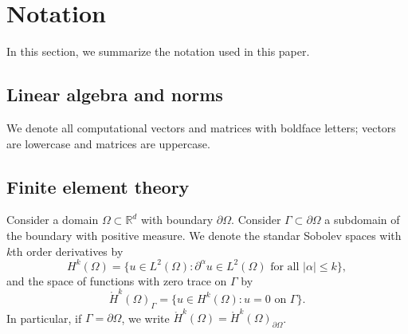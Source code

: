 
\appendix
\section{Notation}

In this section, we summarize the notation used in this paper.

\subsection{Linear algebra and norms}

We denote all computational vectors and matrices with boldface letters; vectors are lowercase and matrices are uppercase.


\subsection{Finite element theory}

Consider a domain \(\Omega \subset \mathbb{R}^d\) with boundary \(\partial \Omega\).
Consider \(\Gamma \subset \partial \Omega\) a subdomain of the boundary with positive measure.
We denote the standar Sobolev spaces with \(k\)th order derivatives by
\[
    H^k(\Omega) = \{ u \in L^2(\Omega) : \partial^\alpha u \in L^2(\Omega) \text{ for all } |\alpha| \leq k \},
\]
and the space of functions with zero trace on \(\Gamma\) by
\[
    \mathring{H}^k(\Omega)_\Gamma = \{ u \in H^k(\Omega) : u = 0 \text{ on } \Gamma \}.
\]
In particular, if \(\Gamma = \partial \Omega\), we write \(\mathring{H}^k(\Omega) = \mathring{H}^k(\Omega)_{\partial \Omega}\).

